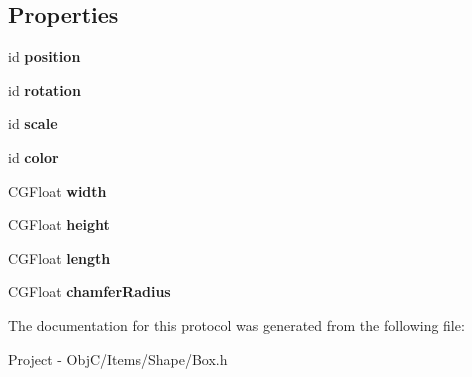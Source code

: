 \subsection*{Properties}
\begin{DoxyCompactItemize}
\item 
\hypertarget{protocol_box_export-p_a7cbbed99076fcb5767f1281df6e8f78b}{}id {\bfseries position}\label{protocol_box_export-p_a7cbbed99076fcb5767f1281df6e8f78b}

\item 
\hypertarget{protocol_box_export-p_a7b951d1ee7bd54e43dfcd28e5b844fab}{}id {\bfseries rotation}\label{protocol_box_export-p_a7b951d1ee7bd54e43dfcd28e5b844fab}

\item 
\hypertarget{protocol_box_export-p_a520c6673c34587a0a07dbe5f7a5d5821}{}id {\bfseries scale}\label{protocol_box_export-p_a520c6673c34587a0a07dbe5f7a5d5821}

\item 
\hypertarget{protocol_box_export-p_aa9c66a1f73258dfca75a1b69506b4c6e}{}id {\bfseries color}\label{protocol_box_export-p_aa9c66a1f73258dfca75a1b69506b4c6e}

\item 
\hypertarget{protocol_box_export-p_aa38432e8fe18b137ecd09eb0f9422a69}{}C\+G\+Float {\bfseries width}\label{protocol_box_export-p_aa38432e8fe18b137ecd09eb0f9422a69}

\item 
\hypertarget{protocol_box_export-p_a645a00da26ceee5823fd1b6679a10c30}{}C\+G\+Float {\bfseries height}\label{protocol_box_export-p_a645a00da26ceee5823fd1b6679a10c30}

\item 
\hypertarget{protocol_box_export-p_aa74283c33aa1b5ba02ad2638363cdd8a}{}C\+G\+Float {\bfseries length}\label{protocol_box_export-p_aa74283c33aa1b5ba02ad2638363cdd8a}

\item 
\hypertarget{protocol_box_export-p_a2c6c32a3d92f63ff060e1aa87ca37918}{}C\+G\+Float {\bfseries chamfer\+Radius}\label{protocol_box_export-p_a2c6c32a3d92f63ff060e1aa87ca37918}

\end{DoxyCompactItemize}


The documentation for this protocol was generated from the following file\+:\begin{DoxyCompactItemize}
\item 
Project -\/ Obj\+C/\+Items/\+Shape/Box.\+h\end{DoxyCompactItemize}
